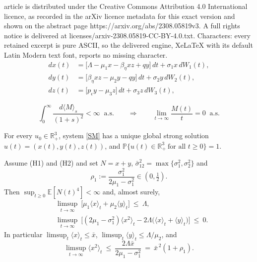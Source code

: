 \documentclass[10pt,a4paper]{amsart}
\newcommand{\avg}[1]{\big\langle #1 \big\rangle_t}
\newcommand{\betaeta}{\beta_\eta}
\newcommand{\peps}{p_\epsilon}
\begin{document}
article is distributed under the Creative Commons Attribution 4.0 International licence, as recorded in the arXiv licence metadata for this exact version and shown on the abstract page https://arxiv.org/abs/2308.05819v3. A full rights notice is delivered at licenses/arxiv-2308.05819-CC-BY-4.0.txt. Characters: every retained excerpt is pure ASCII, so the delivered engine, XeLaTeX with its default Latin Modern text font, reports no missing character.
\begin{equation}\label{SM}
\begin{split}
dx(t) &= \big[\Lambda - \mu_1 x - \betaeta xz + qy\big]\,dt + \sigma_1 x \, dW_1(t), \\
dy(t) &= \big[\betaeta xz - \mu_2 y - qy\big]\,dt + \sigma_2 y \, dW_2(t), \\
dz(t) &= \big[\peps y - \mu_3 z\big]\,dt + \sigma_3 z \, dW_3(t),
\end{split}
\end{equation}

\begin{equation}\label{eq:SLLN}
\int_0^\infty \frac{d\langle M\rangle_s}{(1+s)^2}<\infty \ \text{ a.s.}\qquad\Longrightarrow\qquad \lim_{t\to\infty}\frac{M(t)}{t}=0 \ \text{ a.s.}
\end{equation}

\begin{theorem}\label{Existence}
For every $u_0\in\mathbb{R}^3_+$, system \eqref{SM} has a unique global strong solution $u(t)=(x(t),y(t),z(t))$, and $\mathbb{P}\{u(t)\in\mathbb{R}^3_+\ \text{for all } t\ge0\}=1$.
\end{theorem}

\begin{lemma}\label{lem:occupation}
Assume (H1) and (H2) and set $N=x+y$, $\bar\sigma_{12}^2=\max\{\sigma_1^2,\sigma_2^2\}$ and
\begin{equation}\label{eq:rho1}
\rho_1:=\frac{\sigma_1^2}{2\mu_1-\sigma_1^2}\in(0,\tfrac12).
\end{equation}
Then $\sup_{t\ge0}\mathbb{E}[N(t)^4]<\infty$ and, almost surely,
\begin{align}
&\limsup_{t\to\infty}\ \big[\mu_1\avg{x}+\mu_2\avg{y}\big]\ \le\ \Lambda, \label{eq:occ1}\\[2pt]
&\limsup_{t\to\infty}\ \Big[(2\mu_1-\sigma_1^2)\avg{x^2}-2\Lambda\big(\avg{x}+\avg{y}\big)\Big]\ \le\ 0. \label{eq:occ2}
\end{align}
In particular $\limsup_t\avg{x}\le\bar x$, $\limsup_t\avg{y}\le\Lambda/\mu_2$, and
\begin{equation}\label{eq:secondmomentbound}
\limsup_{t\to\infty}\avg{x^2}\ \le\ \frac{2\Lambda\bar x}{2\mu_1-\sigma_1^2}\ =\ \bar x^{\,2}(1+\rho_1).
\end{equation}
\end{lemma}
\end{document}
